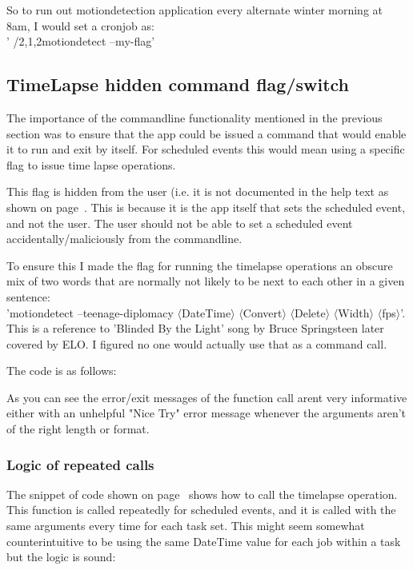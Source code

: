 So to run out motiondetection application every alternate winter morning at 8am, I would set a cronjob as:\\
' \tab*{}\tab*/2,1,2\tab*\tab  motiondetect --my-flag'

\subsection{TimeLapse hidden command flag/switch}

The importance of the commandline functionality mentioned in the previous section was to ensure that the app could be issued a command that would enable it to run and exit by itself. For scheduled events this would mean using a specific flag to issue time lapse operations.

This flag is hidden from the user (i.e. it is not documented in the help text as shown on page~\pageref{frame:help}. This is because it is the app itself that sets the scheduled event, and not the user. The user should not be able to set a scheduled event accidentally/maliciously from the commandline.

To ensure this I made the flag for running the timelapse operations an obscure mix of two words that are normally not likely to be next to each other in a given sentence:\\
'motiondetect --teenage-diplomacy \(\langle\)DateTime\(\rangle\) \(\langle\)Convert\(\rangle\) \(\langle\)Delete\(\rangle\) \(\langle\)Width\(\rangle\) \(\langle\)fps\(\rangle\)'. This is a reference to 'Blinded By the Light' song by Bruce Springsteen later covered by ELO. I figured no one would actually use that as a command call.

The code is as follows:
\begin{frame}{}

\label{code:secret}
\end{frame}

As you can see  the error/exit messages of the function call arent very informative either with an unhelpful "Nice Try" error message whenever the arguments aren't of the right length or format. 

\subsubsection{Logic of repeated calls}

The snippet of code shown on page~\pageref{code:secret} shows how to call the timelapse operation. This function is called repeatedly for scheduled events, and it is called with the same arguments every time for each task set. This might seem somewhat counterintuitive to be using the same DateTime value for each job within a task but the logic is sound:

